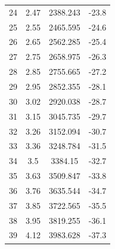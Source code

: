 \documentclass[%
 aip,
 amsmath,amssymb,
 reprint,%
]{revtex4-1}
\begin{document}
\begin{table}[]
\begin{tabular}{@{}cccc@{}}
24 & 2.47 & 2388.243 & -23.8 \\
25 & 2.55 & 2465.595 & -24.6 \\
26 & 2.65 & 2562.285 & -25.4 \\
27 & 2.75 & 2658.975 & -26.3 \\
28 & 2.85 & 2755.665 & -27.2 \\
29 & 2.95 & 2852.355 & -28.1 \\
30 & 3.02 & 2920.038 & -28.7 \\
31 & 3.15 & 3045.735 & -29.7 \\
32 & 3.26 & 3152.094 & -30.7 \\
33 & 3.36 & 3248.784 & -31.5 \\
34 & 3.5  & 3384.15  & -32.7 \\
35 & 3.63 & 3509.847 & -33.8 \\
36 & 3.76 & 3635.544 & -34.7 \\
37 & 3.85 & 3722.565 & -35.5 \\
38 & 3.95 & 3819.255 & -36.1 \\
39 & 4.12 & 3983.628 & -37.3 \\ \bottomrule
\end{tabular}
\end{table}
\end{document}
